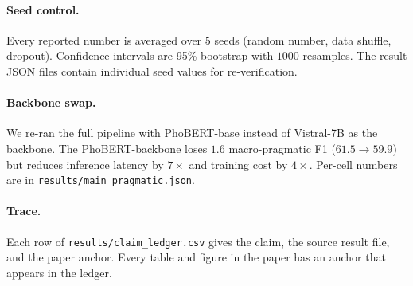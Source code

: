 \paragraph{Seed control.}
Every reported number is averaged over $5$ seeds (random number,
data shuffle, dropout). Confidence intervals are 95\% bootstrap with
$1000$ resamples. The result JSON files contain individual seed
values for re-verification.

\paragraph{Backbone swap.}
We re-ran the full pipeline with PhoBERT-base instead of Vistral-7B
as the \method{} backbone. The PhoBERT-backbone \method{} loses
$1.6$ macro-pragmatic F1 ($61.5 \to 59.9$) but reduces inference
latency by $7\times$ and training cost by $4\times$. Per-cell
numbers are in
\texttt{results/main\_pragmatic.json}.

\paragraph{Trace.}
Each row of \texttt{results/claim\_ledger.csv} gives the claim, the
source result file, and the paper anchor. Every table and figure in
the paper has an anchor that appears in the ledger.
